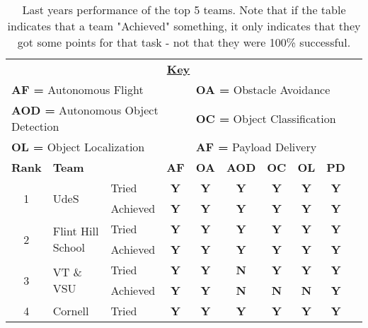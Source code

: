 \documentclass[]{auvsi_doc}
\begin{document}
\begin{artifacttable}
\begin{table}[h!]
	\caption{Last years performance of the top 5 teams. Note that if the table indicates that a team "Achieved" something, it only indicates that they got some points for that task - not that they were 100\% successful.}
	\centering
	\begin{tabular}{ cllccccccc }
		\multicolumn{9}{c}{\textbf{\underline{Key}}} \\
		\multicolumn{4}{l}{\textbf{AF =} Autonomous Flight} & \multicolumn{5}{l}{\textbf{OA =} Obstacle Avoidance} \\
		\multicolumn{4}{l}{\textbf{AOD =} Autonomous Object Detection} & \multicolumn{5}{l}{\textbf{OC =} Object Classification} \\
		\multicolumn{4}{l}{\textbf{OL =} Object Localization} & \multicolumn{5}{l}{\textbf{AF =} Payload Delivery} \\
		\hline
		\textbf{Rank} 	& \textbf{Team} 	&  	& \textbf{AF}  	& \textbf{OA} 	& \textbf{AOD}  	& \textbf{OC} 	& \textbf{OL} 	& \textbf{PD} \\
		\hline
		\multirow{2}{*}{1} 		& \multirow{2}{*}{UdeS} 				& Tried 		& \color{dg}\textbf{Y } 	& \color{dg}\textbf{Y}  	& \color{dg}\textbf{Y} 	& \color{dg}\textbf{Y} 	& \color{dg}\textbf{Y}  	& \color{dg}\textbf{Y}  \\
	 	  					&  								& Achieved	& \color{dg}\textbf{Y} 	& \color{dg}\textbf{Y}  	& \color{dg}\textbf{Y} 	& \color{dg}\textbf{Y} 	& \color{dg}\textbf{Y}  	& \color{dg}\textbf{Y}  \\
		\hline
		\multirow{2}{*}{2} 		& \multirow{2}{*}{Flint Hill School} 		& Tried		& \color{dg}\textbf{Y} 	& \color{dg}\textbf{Y}  	& \color{dg}\textbf{Y} 	& \color{dg}\textbf{Y} 	& \color{dg}\textbf{Y}  	& \color{dg}\textbf{Y}  \\
	 	  					&  								& Achieved	& \color{dg}\textbf{Y} 	& \color{dg}\textbf{Y}  	& \color{dg}\textbf{Y} 	& \color{dg}\textbf{Y} 	& \color{dg}\textbf{Y}  	& \color{dg}\textbf{Y}  \\		
		\hline
		\multirow{2}{*}{3} 		& \multirow{2}{*}{VT \& VSU} 			& Tried		& \color{dg}\textbf{Y} 	& \color{dg}\textbf{Y}  	& \color{red}\textbf{N} 	& \color{dg}\textbf{Y} 	& \color{dg}\textbf{Y}  	& \color{dg}\textbf{Y}  \\	 	  							&  								& Achieved	& \color{dg}\textbf{Y} 	& \color{dg}\textbf{Y}  	& \color{red}\textbf{N} 	& \color{red}\textbf{N} 	& \color{red}\textbf{N}  	& \color{dg}\textbf{Y}  \\		
		\hline
		\multirow{2}{*}{4} 		& \multirow{2}{*}{Cornell} 				& Tried		& \color{dg}\textbf{Y} 	& \color{dg}\textbf{Y}  	& \color{dg}\textbf{Y} 	& \color{dg}\textbf{Y} 	& \color{dg}\textbf{Y}  	& \color{dg}\textbf{Y}  \\	 	  	

\end{tabular}
\end{table}
\end{artifacttable}
\end{document}

